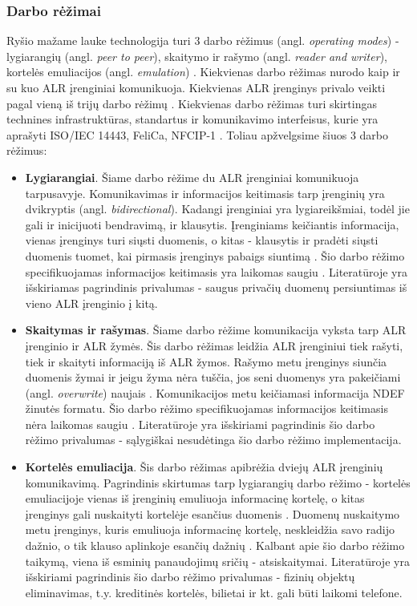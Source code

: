 \subsubsection{Darbo rėžimai}
Ryšio mažame lauke technologija turi 3 darbo rėžimus (angl. \textit{operating modes}) - lygiarangių (angl. \textit{peer to peer}), skaitymo ir rašymo (angl. \textit{reader and writer}), kortelės emuliacijos (angl. \textit{emulation}) \cite{whitepaper2}. Kiekvienas darbo rėžimas nurodo kaip ir su kuo ALR įrenginiai komunikuoja. Kiekvienas ALR įrenginys privalo veikti pagal vieną iš trijų darbo rėžimų \cite{Motlagh2012}. Kiekvienas darbo rėžimas turi skirtingas technines infrastruktūras, standartus ir komunikavimo interfeisus, kurie yra aprašyti ISO/IEC 14443, FeliCa, NFCIP-1 \cite{Leora1980}.
Toliau apžvelgsime šiuos 3 darbo rėžimus:
\begin{itemize}
    \item \textbf{Lygiarangiai}. Šiame darbo rėžime du ALR įrenginiai komunikuoja tarpusavyje. Komunikavimas ir informacijos keitimasis tarp įrenginių yra dvikryptis (angl. \textit{bidirectional}). Kadangi įrenginiai yra lygiareikšmiai, todėl jie gali ir inicijuoti bendravimą, ir klausytis. Įrenginiams keičiantis informacija, vienas įrenginys turi siųsti duomenis, o kitas - klausytis ir pradėti siųsti duomenis tuomet, kai pirmasis įrenginys pabaigs siuntimą \cite{Leora1980}. Šio darbo rėžimo specifikuojamas informacijos keitimasis yra laikomas saugiu \cite{Rahul2015}. Literatūroje \cite{Leora1980} yra išskiriamas pagrindinis privalumas - saugus privačių duomenų persiuntimas iš vieno ALR įrenginio į kitą.
    \item \textbf{Skaitymas ir rašymas}. Šiame darbo rėžime komunikacija vyksta tarp ALR įrenginio ir ALR žymės. Šis darbo rėžimas leidžia ALR įrenginiui tiek rašyti, tiek ir skaityti informaciją iš ALR žymos. Rašymo metu įrenginys siunčia duomenis žymai ir jeigu žyma nėra tuščia, jos seni duomenys yra pakeičiami (angl. \textit{overwrite}) naujais \cite{Leora1980}. Komunikacijos metu keičiamasi informacija NDEF žinutės formatu.  Šio darbo rėžimo specifikuojamas informacijos keitimasis nėra laikomas saugiu \cite{Rahul2015}. Literatūroje \cite{Leora1980} yra išskiriami pagrindinis šio darbo rėžimo privalumas - sąlygiškai nesudėtinga šio darbo rėžimo implementacija.
    \item \textbf{Kortelės emuliacija}. Šis darbo rėžimas apibrėžia dviejų ALR įrenginių komunikavimą. Pagrindinis skirtumas tarp lygiarangių darbo rėžimo - kortelės emuliacijoje vienas iš įrenginių emuliuoja informacinę kortelę, o kitas įrenginys gali nuskaityti kortelėje esančius duomenis \cite{Motlagh2012}. Duomenų nuskaitymo metu įrenginys, kuris emuliuoja informacinę kortelę, neskleidžia savo radijo dažnio, o tik klauso aplinkoje esančių dažnių \cite{Leora1980}. Kalbant apie šio darbo rėžimo taikymą, viena iš esminių panaudojimų sričių - atsiskaitymai. Literatūroje \cite{Leora1980} yra išskiriami pagrindinis šio darbo rėžimo privalumas - fizinių objektų eliminavimas, t.y. kreditinės kortelės, bilietai ir kt. gali būti laikomi telefone.
\end{itemize}

